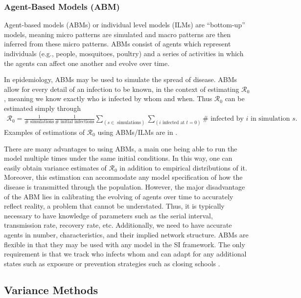 \documentclass[12pt]{article}
\newcommand{\rr}{\ensuremath{\mathcal{R}_0}}
\begin{document}
    

\subsubsection{Agent-Based Models (ABM)}
\label{sec:agent-based-models}
Agent-based models (ABMs) or individual level models (ILMs) are ``bottom-up'' models, meaning micro patterns are simulated and macro patterns are then inferred from these micro patterns.  ABMs consist of agents which represent individuals (e.g., people, mosquitoes, poultry) and a series of activities in which the agents can affect one another and evolve over time.

In epidemiology, ABMs may be used to simulate the spread of disease.  ABMs allow for every detail of an infection to be known, in the context of estimating $\rr$, meaning we know exactly who is infected by whom and when.  Thus $\rr$ can be estimated simply through
\begin{align*}
  \rr = \frac{1}{\# \text{ simulations}}\frac{1}{\#\text{ initial infections}} \sum_{(s \in \text{ simulations})}\sum_{(i \text{ infected at } t=0)} \# \text{ infected by $i$ in simulation }s.
\end{align*}
Examples of estimations of $\rr$ using ABMs/ILMs are in \cite{breban2007,ahmed2013variance}.

There are many advantages to using ABMs, a main one being able to run the model multiple times under the same initial conditions.  In this way, one can easily obtain variance estimates of $\rr$ in addition to empirical distributions of it.  Moreover, this estimation can accommodate any model specification of how the disease is transmitted through the population.  However, the major disadvantage of the ABM lies in calibrating the evolving of agents over time to accurately reflect reality, a problem that cannot be understated.  Thus, it is typically necessary to have knowledge of parameters such as the serial interval, transmission rate, recovery rate, etc.  Additionally, we need to have accurate agents in number, characteristics, and their implied network structure.  ABMs are flexible in that they may be used with any model in the SI framework.  The only requirement is that we track who infects whom and can adapt for any additional states such as exposure or prevention strategies such as closing schools \citep{fred}.







\subsection{Variance Methods}
\label{sec:methods}
\end{document}
